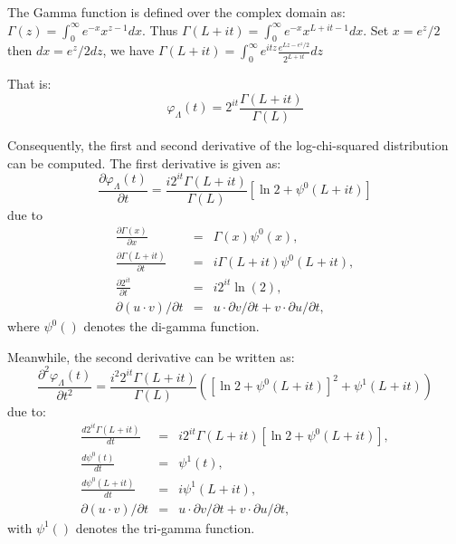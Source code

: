 \documentclass[journal]{IEEEtran}
\begin{document}
The Gamma function is defined over the complex domain as:
$\Gamma(z) = \int_0^\infty  e^{-x} x^{z-1} dx .$
Thus $\Gamma(L+it) = \int_0^\infty  e^{-x} x^{L+it-1} dx .$
Set $x=e^z/2$ then $dx=e^z/2dz$, we have $\Gamma(L+it)= \int_0^\infty  e^{itz} \frac{e^{Lz-e^z/2}}{2^{L+it}} dz$

That is:
\begin{equation}
\varphi_\Lambda(t) = 2^{it} \frac{\Gamma(L+it)}{\Gamma(L)}  
\end{equation}

Consequently, the first and second derivative of the log-chi-squared distribution can be computed.
The first derivative is given as:
\begin{equation}
  \frac{\partial \varphi_\Lambda(t)}{\partial t} = \frac{i 2^{it} \Gamma(L+it)}{\Gamma(L)} \left[ \ln{2} + \psi^0(L+it) \right]
\end{equation}
due to
\begin{eqnarray*}
  \frac{\partial \Gamma(x)}{\partial x} &=& \Gamma(x)\psi^0(x), \\
  \frac{\partial \Gamma(L+it)}{\partial t} &=& i\Gamma(L+it)\psi^0(L+it), \\
  \frac{\partial 2^{it}}{\partial t} &=& i2^{it}\ln(2), \\
  \partial (u \cdot v) / \partial t &=& u \cdot \partial v /\partial t + v \cdot \partial u/\partial t, 
\end{eqnarray*}
where $\psi^0()$ denotes the di-gamma function.

Meanwhile, the second derivative can be written as:
\begin{equation}
  \frac{\partial ^2 \varphi_\Lambda(t)}{\partial t^2} = \frac{i^2 2^{it} \Gamma(L+it)}{\Gamma(L)} \left( \left[ \ln{2} + \psi^0(L+it) \right] ^ 2 + \psi^1(L+it) \right)
\end{equation}
due to:
\begin{eqnarray*}
  \frac{d 2^{it} \Gamma(L+it)}{dt} &=& i 2^{it} \Gamma(L+it) \left[ \ln{2} + \psi^0(L+it) \right], \\
  \frac{d \psi^0(t)}{dt} &=& \psi^1(t), \\
  \frac{d \psi^0(L+it)}{dt} &=& i \psi^1(L+it), \\
  \partial (u \cdot v) / \partial t &=& u \cdot \partial v /\partial t + v \cdot \partial u/\partial t,
\end{eqnarray*}
with $\psi^1()$ denotes the tri-gamma function.
\end{document}
